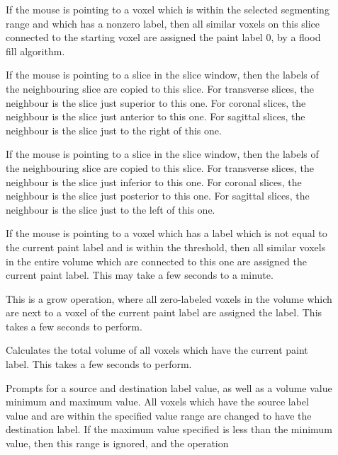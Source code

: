 \begin{description}
\item[]  If the mouse is pointing
    to a voxel which is within the selected segmenting range and which
    has a nonzero label, then all similar voxels on this slice connected
    to the starting voxel are assigned the paint label 0, by a
    flood fill algorithm.
\item[]  If the mouse is
    pointing to a slice in the slice window, then the labels of the
    neighbouring slice are copied to this slice.
    For transverse
    slices, the neighbour is the slice just superior to this one.
    For coronal
    slices, the neighbour is the slice just anterior to this one.
    For sagittal
    slices, the neighbour is the slice just to the right of this one.
\item[]  If the mouse is
    pointing to a slice in the slice window, then the labels of the
    neighbouring slice are copied to this slice.
    For transverse
    slices, the neighbour is the slice just inferior to this one.
    For coronal
    slices, the neighbour is the slice just posterior to this one.
    For sagittal
    slices, the neighbour is the slice just to the left of this one.
\item[]  If the mouse is pointing to a
    voxel which has a label which is not equal to the current paint
    label and is within the threshold, then
    all similar voxels in the entire volume which are connected to
    this one are assigned the current paint label.
    This may take a few seconds to a minute.
\item[]  This is a grow operation,
    where all zero-labeled voxels in the volume which are next to
    a voxel of the current paint label are assigned the label.
    This takes a few seconds to perform.
\item[]  Calculates the
    total volume of all voxels which have the current paint label.
    This takes a few seconds to perform.
\item[]  Prompts for a source
    and destination label value, as well as a volume value minimum and
    maximum value.  All voxels which have the source label value and
    are within the specified value range are changed to have the
    destination label.  If the maximum value specified is less than
    the minimum value, then this range is ignored, and the operation

\end{description}
